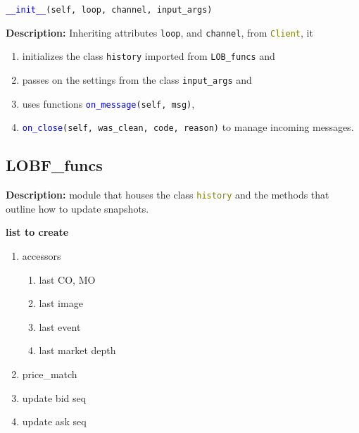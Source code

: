 \textcolor{blue}{\texttt{\_\_init\_\_}}\texttt{(self, loop, channel, input\_args)}
\medskip

\noindent \textbf{Description:} Inheriting attributes \texttt{loop}, and \texttt{channel}, from \textcolor{olive}{\texttt{Client}}, it
\begin{enumerate} 
	\item initializes the class \texttt{history} imported from \texttt{LOB\_funcs} and
	\item passes on the settings from the class \texttt{input\_args} and \item uses functions \textcolor{blue}{\texttt{on\_message}}\texttt{(self, msg)},
	\item \textcolor{blue}{\texttt{on\_close}}\texttt{(self, was\_clean, code, reason)} to manage incoming messages.
\end{enumerate} 









\subsection{LOBF\_funcs}
\hfill \break
\textbf{Description:} module that houses the class \textcolor{olive}{\texttt{history}} and the methods that outline how to update snapshots.




\textbf{list to create}


\begin{enumerate}
	\item accessors\begin{enumerate}
		\item last CO, MO
		\item last image
		\item last event
		\item last market depth
	\end{enumerate}
	\item price\_match 
	\item update bid seq
	\item update ask seq
\end{enumerate}

